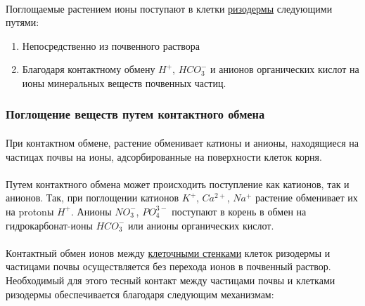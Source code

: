 \paragraph*{}Поглощаемые растением ионы поступают в клетки \hyperlink{question_rizoderma}{ризодермы} следующими путями:

\begin{enumerate}
	\item Непосредственно из почвенного раствора
	\item Благодаря контактному обмену $H^{+}$, $HCO^{-}_{3}$ и анионов органических кислот на ионы минеральных веществ почвенных частиц.
\end{enumerate} 

\subsubsection*{Поглощение веществ путем контактного обмена}

\paragraph*{}

\paragraph*{}При \hypertarget{contact_exchanging}{контактном обмене}, растение обменивает катионы и анионы, находящиеся на частицах почвы на ионы, адсорбированные на поверхности клеток корня. 

\paragraph*{}Путем контактного обмена может происходить поступление как катионов, так и анионов. Так, при поглощении катионов  $K^{+}$, $Ca^{2+}$, $Na^{+}$ растение обменивает их на \gls{proton}ы $H^{+}$. Анионы $NO^{-}_{3}$, $PO^{3-}_{4}$ поступают в корень в обмен на гидрокарбонат-ионы $HCO^{-}_{3}$ или анионы органических кислот. 

\paragraph*{}Контактный обмен ионов между \hyperlink{cell_wall}{клеточными стенками} клеток ризодермы и частицами почвы осуществляется без перехода ионов в почвенный раствор. Необходимый для этого тесный контакт между частицами почвы и клетками ризодермы обеспечивается благодаря следующим механизмам:

